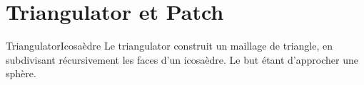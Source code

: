 \documentclass[french]{beamer}
\begin{document}
\section{Triangulator et Patch}
\begin{frame}{Triangulator}{Icosaèdre}
  Le triangulator construit un maillage de triangle, en subdivisant récursivement les faces d'un icosaèdre. Le but étant d'approcher une sphère.
\begin{figure}[H]
\centerline{
}
\end{figure}
\end{frame}
\end{document}
